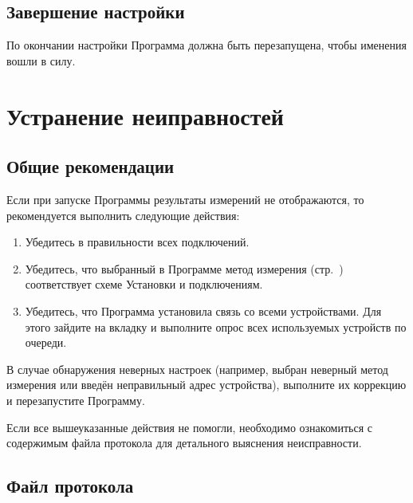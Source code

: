 \documentclass[12pt, a4paper, twocolumn]{report}
\begin{document}


\section{Завершение настройки}

По окончании настройки Программа должна быть перезапущена, чтобы именения вошли в силу.

\chapter{Устранение неиправностей}

\section{Общие рекомендации}

Если при запуске Программы результаты измерений не отображаются, то рекомендуется выполнить следующие действия:

\begin{enumerate}
\item Убедитесь в правильности всех подключений.
\item Убедитесь, что выбранный в Программе метод измерения (стр.~\pageref{sec_r_measure_config}) соответствует схеме Установки и подключениям.
\item Убедитесь, что Программа установила связь со всеми устройствами. Для этого зайдите на вкладку  и выполните опрос всех используемых устройств по очереди.
\end{enumerate}

В случае обнаружения неверных настроек (например, выбран неверный метод измерения или введён неправильный адрес устройства), выполните их коррекцию и перезапустите Программу.

Если все вышеуказанные действия не помогли, необходимо ознакомиться с содержимым файла протокола для детального выяснения неисправности.

\section{Файл протокола}


\end{document}
